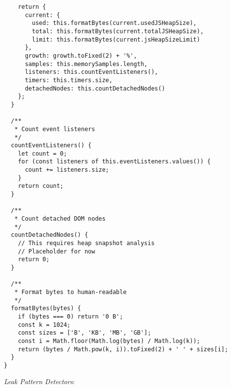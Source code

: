 \documentclass[11pt]{article}
\begin{document}
\begin{verbatim}
    return {
      current: {
        used: this.formatBytes(current.usedJSHeapSize),
        total: this.formatBytes(current.totalJSHeapSize),
        limit: this.formatBytes(current.jsHeapSizeLimit)
      },
      growth: growth.toFixed(2) + '%',
      samples: this.memorySamples.length,
      listeners: this.countEventListeners(),
      timers: this.timers.size,
      detachedNodes: this.countDetachedNodes()
    };
  }
  
  /**
   * Count event listeners
   */
  countEventListeners() {
    let count = 0;
    for (const listeners of this.eventListeners.values()) {
      count += listeners.size;
    }
    return count;
  }
  
  /**
   * Count detached DOM nodes
   */
  countDetachedNodes() {
    // This requires heap snapshot analysis
    // Placeholder for now
    return 0;
  }
  
  /**
   * Format bytes to human-readable
   */
  formatBytes(bytes) {
    if (bytes === 0) return '0 B';
    const k = 1024;
    const sizes = ['B', 'KB', 'MB', 'GB'];
    const i = Math.floor(Math.log(bytes) / Math.log(k));
    return (bytes / Math.pow(k, i)).toFixed(2) + ' ' + sizes[i];
  }
}
\end{verbatim}

\emph{Leak Pattern Detectors}:
\end{document}
